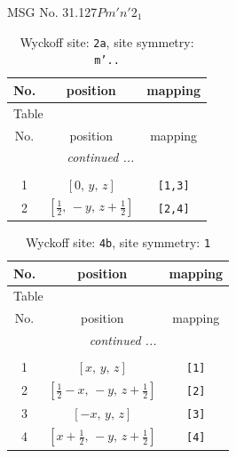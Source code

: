 \documentclass[fleqn,8pt]{jsarticle}
\begin{document}
\setcounter{MaxMatrixCols}{32}

\renewcommand{\tablename}{Table~}
\renewcommand{\figurename}{Figure~}
\begin{center}
\LARGE
MSG No. 31.127\quad$Pm'n'2_{1}$
\end{center}
\renewcommand{\arraystretch}{1.2}
\begin{longtable}{ccc}
\caption{Wyckoff site: {\tt 2a}, site symmetry: {\tt m'..}}
 \\
 \hline \hline
No. & position & mapping \\ \hline \endfirsthead

\multicolumn{2}{l}{\tablename\ \thetable{}} \\
 \hline \hline
No. & position & mapping \\ \hline \endhead

 \hline \hline
\multicolumn{2}{r}{\footnotesize\it continued ...} \\ \endfoot

 \hline \hline
\multicolumn{2}{r}{} \\ \endlastfoot

1 & $\left[ 0,\, y,\, z \right]$ & {\tt [1,3]} \\ \hline
2 & $\left[ \frac{1}{2},\, - y,\, z + \frac{1}{2} \right]$ & {\tt [2,4]} \\
\end{longtable}
\renewcommand{\arraystretch}{1.2}
\begin{longtable}{ccc}
\caption{Wyckoff site: {\tt 4b}, site symmetry: {\tt 1}}
 \\
 \hline \hline
No. & position & mapping \\ \hline \endfirsthead

\multicolumn{2}{l}{\tablename\ \thetable{}} \\
 \hline \hline
No. & position & mapping \\ \hline \endhead

 \hline \hline
\multicolumn{2}{r}{\footnotesize\it continued ...} \\ \endfoot

 \hline \hline
\multicolumn{2}{r}{} \\ \endlastfoot

1 & $\left[ x,\, y,\, z \right]$ & {\tt [1]} \\ \hline
2 & $\left[ \frac{1}{2} - x,\, - y,\, z + \frac{1}{2} \right]$ & {\tt [2]} \\ \hline
3 & $\left[ - x,\, y,\, z \right]$ & {\tt [3]} \\ \hline
4 & $\left[ x + \frac{1}{2},\, - y,\, z + \frac{1}{2} \right]$ & {\tt [4]} \\
\end{longtable}
\end{document}
